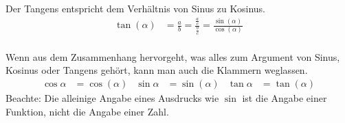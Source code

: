 \begin{folg}
 Der Tangens entspricht dem Verhältnis von Sinus zu Kosinus.
 \begin{align*}
  \tan (\alpha ) &= \frac{a}{b} = \frac{\frac{a}{c}}{\frac{b}{c}} = \frac{\sin(\alpha)}{\cos(\alpha)}\\
 \end{align*}

\end{folg}

\begin{beme}[Notation]
 Wenn aus dem Zusammenhang hervorgeht, was alles zum Argument von Sinus, Kosinus oder Tangens gehört, kann man auch die Klammern weglassen.
 \begin{align*}
  \cos \alpha &= \cos (\alpha) & \sin \alpha &= \sin (\alpha) & \tan \alpha &= \tan (\alpha)
 \end{align*}
Beachte: Die alleinige Angabe eines Ausdrucks wie \(\sin\) ist die Angabe einer Funktion, nicht die Angabe einer Zahl.
\end{beme}

